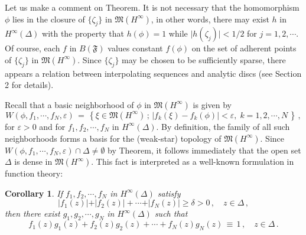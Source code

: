 \documentclass[12pt]{amsart}
\theoremstyle{plain}
\newtheorem*{cor}{Corollary}
\numberwithin{equation}{section}
\begin{document}
Let us make a comment on Theorem.
It is not necessary that the homomorphism $\phi$
lies in the closure of $\{\zeta_j\}$ in $\mathfrak{M}(H^\infty)$,
in other words, there may exist $h$ in $H^\infty(\Delta)$ with the
property that $h(\phi) = 1$ while $\vert h(\zeta_j)\vert < 1/2$ for
 $j=1,2,\cdots.$ Of course, each $f$ in $B(\mathfrak{F})$ values constant $f(\phi)$ on the set of adherent points
of $\{\zeta_j\}$ in $\mathfrak{M}(H^\infty)$. Since $\{\zeta_j\}$ may be
chosen to be sufficiently sparse, there appears a relation between
interpolating sequences and analytic discs (see Section 2 for details).

Recall that a basic neighborhood of $\phi$ in
$\mathfrak{M}(H^\infty)$ is given by
\begin{equation}
\label{eq1.3}
W(\phi, f_1,\cdots, f_N, \varepsilon)\,=\,\left\{ \xi \in
\mathfrak{M}(H^\infty)\,;\, \vert f_k(\xi)- f_k(\phi)\vert <\varepsilon, \;
k=1,2,\cdots, N \,\right\}\,,
\end{equation}
for $\varepsilon > 0$ and for $f_1, f_2, \cdots, f_N$  in
$H^\infty(\Delta)$. By definition, the family of all such neighborhoods
forms a basis for the (weak-star) topology of $\mathfrak{M}(H^\infty)$.
Since $W(\phi, f_1, \cdots, f_N, \varepsilon)
\cap \Delta \neq \emptyset$ by Theorem, it follows immediately
that the open set $\Delta$ is dense in $\mathfrak{M}(H^\infty)$. This fact is interpreted as a well-known formulation in function theory:

\begin{cor}
If $f_1, f_2, \cdots, f_N $ in $H^\infty(\Delta)$ satisfy
$$
\vert f_1(z) \vert +\vert f_2(z) \vert + \cdots +\vert f_N(z) \vert
\ge \delta > 0\,,\quad z \in \Delta\,,
$$
then there exist $g_1, g_2, \cdots, g_N $ in $H^\infty(\Delta)$
such that
$$
f_1(z)g_1(z) +f_2(z)g_2(z)  + \cdots +f_N(z)g_N(z) \,\equiv \,1\,,\quad z \in \Delta\,.
$$
\end{cor}
\end{document}
